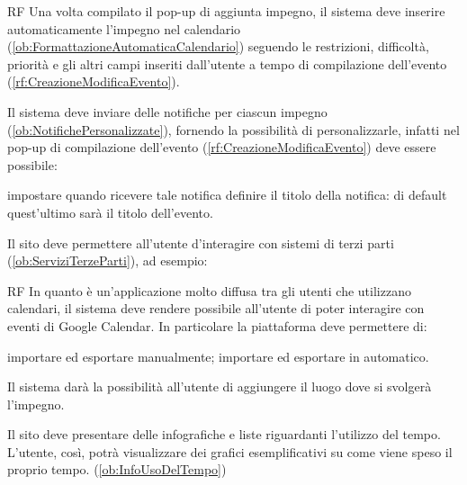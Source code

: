 \begin{listaPersonale}{RF}
	 Una volta compilato il pop-up di aggiunta impegno, il sistema deve inserire automaticamente l'impegno nel calendario (\ref{ob:FormattazioneAutomaticaCalendario}) seguendo le restrizioni, difficoltà, priorità e gli altri campi inseriti dall'utente a tempo di compilazione dell'evento (\ref{rf:CreazioneModificaEvento}).

	 Il sistema deve inviare delle notifiche per ciascun impegno (\ref{ob:NotifichePersonalizzate}), fornendo la possibilità di personalizzarle, infatti nel pop-up di compilazione dell'evento (\ref{rf:CreazioneModificaEvento}) deve essere possibile:
	\begin{listaPersonale2}{}
		 impostare quando ricevere tale notifica
		 definire il titolo della notifica: di default quest'ultimo sarà il titolo dell'evento.
	\end{listaPersonale2}

	 Il sito deve permettere all'utente d'interagire con sistemi di terzi parti (\ref{ob:ServiziTerzeParti}), ad esempio:

	\begin{listaPersonale2}{RF}
		 In quanto è un'applicazione molto diffusa tra gli utenti che utilizzano calendari, il sistema deve rendere possibile all'utente di poter interagire con eventi di Google Calendar. In particolare la piattaforma deve permettere di:
		\begin{listaPersonale3}{}
			 importare ed esportare manualmente;
			 importare ed esportare in automatico.
		\end{listaPersonale3}

		 Il sistema darà la possibilità all'utente di aggiungere il luogo dove si svolgerà l'impegno.
	\end{listaPersonale2}

	 Il sito deve presentare delle infografiche e liste riguardanti l'utilizzo del tempo. L'utente, così, potrà visualizzare dei grafici esemplificativi su come viene speso il proprio tempo. (\ref{ob:InfoUsoDelTempo})


\end{listaPersonale}
